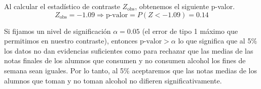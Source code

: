 Al calcular el estadístico de contraste $Z_{\text{obs}}$, obtenemos el siguiente p-valor.
\begin{equation}
    Z_{\text{obs}} = -1.09 \Rightarrow \text{p-valor} = P(Z < -1.09) = 0.14
\end{equation}

Si fijamos un nivel de significación $\alpha = 0.05$ (el error de tipo 1 máximo que permitimos en nuestro contraste), entonces $\text{p-valor} > \alpha$ lo que significa que al 5\% los datos no dan evidencias suficientes como para rechazar que las medias de las notas finales de los alumnos que consumen y no consumen alcohol los fines de semana sean iguales. Por lo tanto, al 5\% aceptaremos que las notas medias de los alumnos que toman y no toman alcohol no difieren significativamente.
